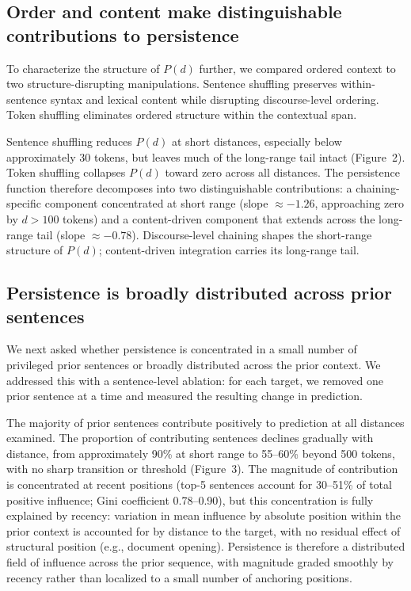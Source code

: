 \documentclass[11pt]{article}
\begin{document}
\subsection{Order and content make distinguishable contributions to persistence}

To characterize the structure of $P(d)$ further, we compared ordered context to two
structure-disrupting manipulations. Sentence shuffling preserves within-sentence syntax
and lexical content while disrupting discourse-level ordering. Token shuffling
eliminates ordered structure within the contextual span.

Sentence shuffling reduces $P(d)$ at short distances, especially below approximately 30
tokens, but leaves much of the long-range tail intact (Figure~2). Token shuffling
collapses $P(d)$ toward zero across all distances. The persistence function therefore
decomposes into two distinguishable contributions: a chaining-specific component
concentrated at short range (slope $\approx -1.26$, approaching zero by $d > 100$
tokens) and a content-driven component that extends across the long-range tail (slope
$\approx -0.78$). Discourse-level chaining shapes the short-range structure of $P(d)$;
content-driven integration carries its long-range tail.

\subsection{Persistence is broadly distributed across prior sentences}

We next asked whether persistence is concentrated in a small number of privileged prior
sentences or broadly distributed across the prior context. We addressed this with a
sentence-level ablation: for each target, we removed one prior sentence at a time and
measured the resulting change in prediction.

The majority of prior sentences contribute positively to prediction at all distances
examined. The proportion of contributing sentences declines gradually with distance,
from approximately 90\% at short range to 55--60\% beyond 500 tokens, with no sharp
transition or threshold (Figure~3). The magnitude of contribution is concentrated at
recent positions (top-5 sentences account for 30--51\% of total positive influence;
Gini coefficient 0.78--0.90), but this concentration is fully explained by recency:
variation in mean influence by absolute position within the prior context is accounted
for by distance to the target, with no residual effect of structural position (e.g.,
document opening). Persistence is therefore a distributed field of influence across the
prior sequence, with magnitude graded smoothly by recency rather than localized to a
small number of anchoring positions.
\end{document}
